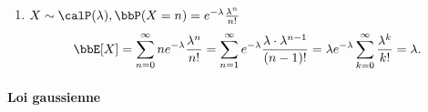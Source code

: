 \begin{exem}
\begin{enumerate}
\begin{align*}
                  \bbE[X] & = \sum_{k = 1}^\infty k \bbP(X = k) = \sum_{k = 1}^\infty kpq^{k - 1}
                  = p \sum_{k = 1}^\infty k q^{k - 1} = \frac{p}{(1 - q)^2} = \frac{1}{p}.
              \end{align*}
              En effet, pour $0 < x < 1$, $\varphi(x) = \sum_{k = 1}^\infty x^k = \frac{x}{1 - x}$,
              d'où $\varphi'(x) = \sum_{k = 1}^\infty kx^{k - 1} = \frac{1}{(1 - x)^2}$.
        \item $X \sim \calP(\lambda), \bbP(X = n) = e^{-\lambda} \frac{\lambda^n}{n!}$
              \[ \bbE[X] = \sum_{n = 0}^\infty ne^{-\lambda}\frac{\lambda^n}{n!}
                  = \sum_{n = 1}^\infty e^{-\lambda} \frac{\lambda \cdot \lambda^{n - 1}}{(n - 1)!}
                  = \lambda e^{-\lambda} \sum_{k = 0}^\infty \frac{\lambda^k}{k!} = \lambda. \]
    \end{enumerate}
\end{exem}

\paragraph{Loi gaussienne}

